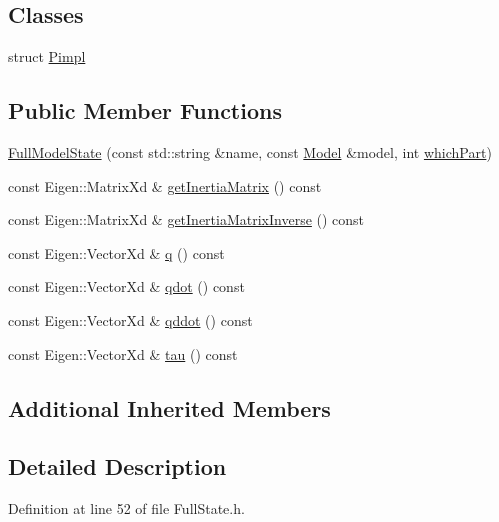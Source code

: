 \subsection*{Classes}
\begin{DoxyCompactItemize}
\item 
struct \hyperlink{structocra_1_1FullModelState_1_1Pimpl}{Pimpl}
\end{DoxyCompactItemize}
\subsection*{Public Member Functions}
\begin{DoxyCompactItemize}
\item 
\hyperlink{classocra_1_1FullModelState_a2fc326508bd940f338c614c18549a7ba}{Full\+Model\+State} (const std\+::string \&name, const \hyperlink{classocra_1_1Model}{Model} \&model, int \hyperlink{classocra_1_1FullState_a489d85a3e8d2a88f31f0cac4e5f445bf}{which\+Part})
\item 
const Eigen\+::\+Matrix\+Xd \& \hyperlink{classocra_1_1FullModelState_a9bd24ba5f48bd47a055e42e0ca831b3e}{get\+Inertia\+Matrix} () const 
\item 
const Eigen\+::\+Matrix\+Xd \& \hyperlink{classocra_1_1FullModelState_a0d55b7835581c40b6704f7835fabc1c8}{get\+Inertia\+Matrix\+Inverse} () const 
\item 
const Eigen\+::\+Vector\+Xd \& \hyperlink{classocra_1_1FullModelState_a78d009f0a8f4fc5261b01456233138a4}{q} () const 
\item 
const Eigen\+::\+Vector\+Xd \& \hyperlink{classocra_1_1FullModelState_ae48a726f1118d4783452261b92667fe2}{qdot} () const 
\item 
const Eigen\+::\+Vector\+Xd \& \hyperlink{classocra_1_1FullModelState_a162129de9bae7fec66e167c097b655c1}{qddot} () const 
\item 
const Eigen\+::\+Vector\+Xd \& \hyperlink{classocra_1_1FullModelState_a8694e03a8953f34e0b9f03f5a65d70e3}{tau} () const 
\end{DoxyCompactItemize}
\subsection*{Additional Inherited Members}


\subsection{Detailed Description}


Definition at line 52 of file Full\+State.\+h.



